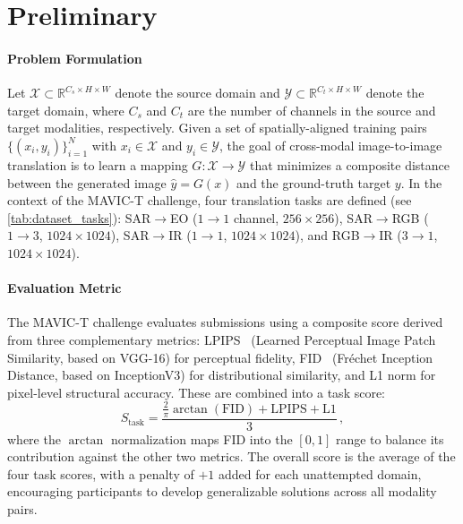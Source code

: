 \section{Preliminary}
\label{sec:preliminary}

\paragraph{Problem Formulation}
Let $\mathcal{X} \subset \mathbb{R}^{C_s \times H \times W}$ denote the source domain and $\mathcal{Y} \subset \mathbb{R}^{C_t \times H \times W}$ denote the target domain, where $C_s$ and $C_t$ are the number of channels in the source and target modalities, respectively. Given a set of spatially-aligned training pairs $\{(x_i, y_i)\}_{i=1}^{N}$ with $x_i \in \mathcal{X}$ and $y_i \in \mathcal{Y}$, the goal of cross-modal image-to-image translation is to learn a mapping $G: \mathcal{X} \rightarrow \mathcal{Y}$ that minimizes a composite distance between the generated image $\hat{y} = G(x)$ and the ground-truth target $y$. In the context of the MAVIC-T challenge, four translation tasks are defined (see \cref{tab:dataset_tasks}): SAR$\rightarrow$EO ($1 \!\rightarrow\! 1$ channel, $256 \times 256$), SAR$\rightarrow$RGB ($1 \!\rightarrow\! 3$, $1024 \times 1024$), SAR$\rightarrow$IR ($1 \!\rightarrow\! 1$, $1024 \times 1024$), and RGB$\rightarrow$IR ($3 \!\rightarrow\! 1$, $1024 \times 1024$).

\paragraph{Evaluation Metric}
The MAVIC-T challenge evaluates submissions using a composite score derived from three complementary metrics: LPIPS~\cite{zhangUnreasonableEffectivenessDeep2018} (Learned Perceptual Image Patch Similarity, based on VGG-16) for perceptual fidelity, FID~\cite{heuselGANsTrainedTwo2017} (Fr\'{e}chet Inception Distance, based on InceptionV3) for distributional similarity, and L1 norm for pixel-level structural accuracy. These are combined into a task score:
\begin{equation}
    S_{\text{task}} = \frac{\tfrac{2}{\pi}\arctan(\text{FID}) + \text{LPIPS} + \text{L1}}{3}\,,
    \label{eq:task_score}
\end{equation}
where the $\arctan$ normalization maps FID into the $[0, 1]$ range to balance its contribution against the other two metrics. The overall score is the average of the four task scores, with a penalty of $+1$ added for each unattempted domain, encouraging participants to develop generalizable solutions across all modality pairs.


